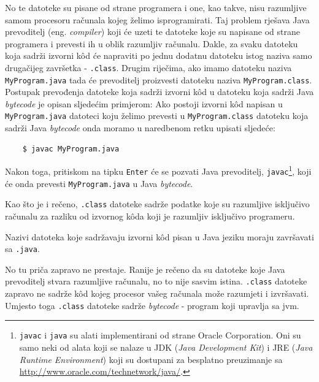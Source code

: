 No te datoteke su pisane od strane programera i one, kao takve, nisu razumljive samom procesoru računala kojeg želimo isprogramirati. Taj problem rješava Java prevoditelj (eng. \emph{compiler}) koji će uzeti te datoteke koje su napisane od strane programera i prevesti ih u oblik razumljiv računalu. Dakle, za svaku datoteku koja sadrži izvorni kôd će napraviti po jednu dodatnu datoteku istog naziva samo drugačijeg završetka - \texttt{.class}. Drugim riječima, ako imamo datoteku naziva \texttt{MyProgram.java} tada će prevoditelj proizvesti datoteku naziva \texttt{MyProgram.class}. Postupak prevođenja datoteke koja sadrži izvorni kôd u datoteku koja sadrži Java \emph{bytecode} je opisan sljedećim primjerom: Ako postoji izvorni kôd napisan u \texttt{MyProgram.java} datoteci koju želimo prevesti u \texttt{MyProgram.class} datoteku koja sadrži Java \emph{bytecode} onda moramo u naredbenom retku upisati sljedeće:

\begin{lstlisting}
    $ javac MyProgram.java
\end{lstlisting}

Nakon toga, pritiskom na tipku \texttt{Enter} će se pozvati Java prevoditelj, \texttt{javac}\footnote{\label{ftn:javaandjavac}\texttt{javac} i \texttt{java} su alati implementirani od strane Oracle Corporation. Oni su samo neki od alata koji se nalaze u JDK (\emph{Java Development Kit}) i JRE (\emph{Java Runtime Environment}) koji su dostupani za besplatno preuzimanje sa \url{http://www.oracle.com/technetwork/java/}.}, koji će onda prevesti \texttt{MyProgram.java} u Java \emph{bytecode}.

Kao što je i rečeno, \texttt{.class} datoteke sadrže podatke koje su razumljive isključivo računalu za razliku od izvornog kôda koji je razumljiv isključivo programeru.

\begin{infobox}
    Nazivi datoteka koje sadržavaju izvorni kôd pisan u Java jeziku moraju završavati sa \texttt{.java}.
\end{infobox}

No tu priča zapravo ne prestaje. Ranije je rečeno da su datoteke koje Java prevoditelj stvara razumljive računalu, no to nije sasvim istina. \texttt{.class} datoteke zapravo ne sadrže kôd kojeg procesor vašeg računala može razumjeti i izvršavati. Umjesto toga \texttt{.class} datoteke sadrže \emph{bytecode} - program koji upravlja sa \gls{jvm}.

